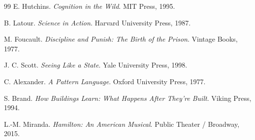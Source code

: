 \documentclass[11pt,oneside]{article}
\begin{document}
\begin{thebibliography}{99}
E. Hutchins.
\newblock \emph{Cognition in the Wild}.
\newblock MIT Press, 1995.

B. Latour.
\newblock \emph{Science in Action}.
\newblock Harvard University Press, 1987.

M. Foucault.
\newblock \emph{Discipline and Punish: The Birth of the Prison}.
\newblock Vintage Books, 1977.

J. C. Scott.
\newblock \emph{Seeing Like a State}.
\newblock Yale University Press, 1998.

C. Alexander.
\newblock \emph{A Pattern Language}.
\newblock Oxford University Press, 1977.

S. Brand.
\newblock \emph{How Buildings Learn: What Happens After They’re Built}.
\newblock Viking Press, 1994.

L.-M. Miranda.
\newblock \emph{Hamilton: An American Musical}.
\newblock Public Theater / Broadway, 2015.

\end{thebibliography}
\end{document}
